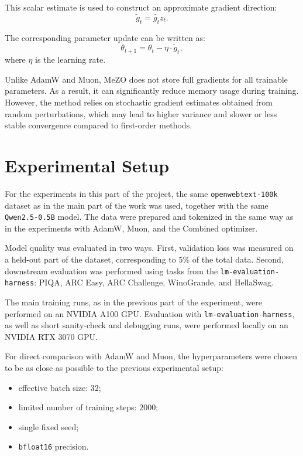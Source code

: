 \documentclass{article}
\begin{document}
This scalar estimate is used to construct an approximate gradient direction:
\[
\tilde{g}_t = \hat{g}_t z_t.
\]

The corresponding parameter update can be written as:
\[
\theta_{t+1}
=
\theta_t - \eta \cdot \tilde{g}_t,
\]
where $\eta$ is the learning rate.

Unlike AdamW and Muon, MeZO does not store full gradients for all trainable parameters. As a result, it can significantly reduce memory usage during training. However, the method relies on stochastic gradient estimates obtained from random perturbations, which may lead to higher variance and slower or less stable convergence compared to first-order methods.

\section{Experimental Setup}

For the experiments in this part of the project, the same \texttt{openwebtext-100k} dataset as in the main part of the work was used, together with the same \texttt{Qwen2.5-0.5B} model. The data were prepared and tokenized in the same way as in the experiments with AdamW, Muon, and the Combined optimizer.

Model quality was evaluated in two ways. First, validation loss was measured on a held-out part of the dataset, corresponding to $5\%$ of the total data. Second, downstream evaluation was performed using tasks from the \texttt{lm-evaluation-harness}: PIQA, ARC Easy, ARC Challenge, WinoGrande, and HellaSwag.

The main training runs, as in the previous part of the experiment, were performed on an NVIDIA A100 GPU. Evaluation with \texttt{lm-evaluation-harness}, as well as short sanity-check and debugging runs, were performed locally on an NVIDIA RTX 3070 GPU.

For direct comparison with AdamW and Muon, the hyperparameters were chosen to be as close as possible to the previous experimental setup:

\begin{itemize}
    \item effective batch size: $32$;
    \item limited number of training steps: $2000$;
    \item single fixed seed;
    \item \texttt{bfloat16} precision.
\end{itemize}
\end{document}
